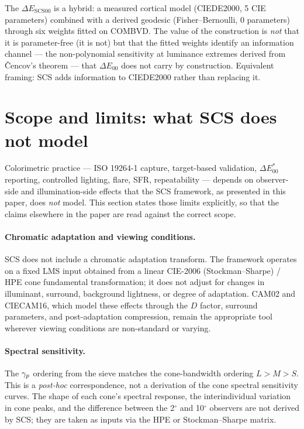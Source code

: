 \documentclass[12pt,a4paper]{article}
\begin{document}
The $\Delta E_{\mathrm{SCS00}}$ is a hybrid: a measured cortical model
(CIEDE2000, 5 CIE parameters) combined with a derived geodesic
(Fisher--Bernoulli, 0 parameters) through six weights fitted on COMBVD.
The value of the construction is \emph{not} that it is parameter-free
(it is not) but that the fitted weights identify an information channel
--- the non-polynomial sensitivity at luminance extremes derived from
\v{C}encov's theorem --- that $\Delta E_{00}$ does not carry by
construction. Equivalent framing: SCS adds information to CIEDE2000
rather than replacing it.

\section{Scope and limits: what SCS does not model}
\label{sec:scope_limits}

Colorimetric practice --- ISO 19264-1 capture, target-based validation,
$\Delta E^*_{00}$ reporting, controlled lighting, flare, SFR,
repeatability --- depends on observer-side and illumination-side effects
that the SCS framework, as presented in this paper, does \emph{not}
model. This section states those limits explicitly, so that the claims
elsewhere in the paper are read against the correct scope.

\paragraph{Chromatic adaptation and viewing conditions.}
SCS does not include a chromatic adaptation transform. The framework
operates on a fixed LMS input obtained from a linear CIE-2006
(Stockman--Sharpe) / HPE cone fundamental transformation; it does not
adjust for changes in illuminant, surround, background lightness, or
degree of adaptation. CAM02 and CIECAM16, which model these effects
through the $D$ factor, surround parameters, and post-adaptation
compression, remain the appropriate tool wherever viewing conditions
are non-standard or varying.

\paragraph{Spectral sensitivity.}
The $\gamma_{p}$ ordering from the sieve matches the cone-bandwidth
ordering $L > M > S$. This is a \emph{post-hoc} correspondence, not
a derivation of the cone spectral sensitivity curves. The shape of
each cone's spectral response, the interindividual variation in cone
peaks, and the difference between the 2$^\circ$ and 10$^\circ$ observers
are not derived by SCS; they are taken as inputs via the HPE or
Stockman--Sharpe matrix.
\end{document}
